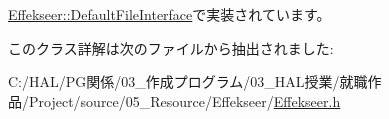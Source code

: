 \mbox{\hyperlink{class_effekseer_1_1_default_file_interface_aecbcd4350ca701360dcea88a2c5f9c64}{Effekseer\+::\+Default\+File\+Interface}}で実装されています。



このクラス詳解は次のファイルから抽出されました\+:\begin{DoxyCompactItemize}
\item 
C\+:/\+H\+A\+L/\+P\+G関係/03\+\_\+作成プログラム/03\+\_\+\+H\+A\+L授業/就職作品/\+Project/source/05\+\_\+\+Resource/\+Effekseer/\mbox{\hyperlink{_effekseer_8h}{Effekseer.\+h}}\end{DoxyCompactItemize}
